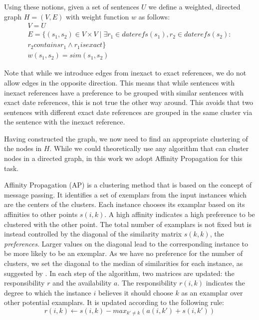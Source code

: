 \documentclass[a4paper,BCOR=10mm]{report}
\numberwithin{lemma}{chapter}
\numberwithin{definition}{chapter}
\begin{document}
Using these notions, given a set of sentences $U$ we define a weighted, directed graph $H = (V, E)$ with weight function $w$ as follows:
\begin{align}
V = U \\
E = \{ (s_1, s_2) \in V \times V \mid \exists r_1 \in \mathit{daterefs}(s_1), r_2 \in \mathit{daterefs}(s_2) \colon \\ r_2 \mathit{ contains } r_1 \land r_1 \mathit{ is exact} \} \\ %
w(s_1, s_2) = \mathit{sim}(s_1, s_2)
\end{align}

Note that while we introduce edges from inexact to exact references, we do not allow edges in the opposite direction. This means that while sentences with inexact references have a preference to be grouped with similar sentences with exact date references, this is not true the other way around.
This avoids that two sentences with different exact date references are grouped in the same cluster via the sentence with the inexact reference.

Having constructed the graph, we now need to find an appropriate clustering of the nodes in $H$. While we could theoretically use any algorithm that can cluster nodes in a directed graph, in this work we adopt Affinity Propagation for this task.

Affinity Propagation (AP) \citep{ap} is a clustering method that is based on the concept of message passing. It identifies a set of exemplars from the input instances which are the centers of the clusters. Each instance chooses its examplar based on its affinities to other points $s(i, k)$. A high affinity indicates a high preference to be clustered with the other point.
The total number of examplars is not fixed but is instead controlled by the diagonal of the similarity matrix $s(k, k)$, the \textit{preferences}. Larger values on the diagonal lead to the corresponding instance to be more likely to be an exemplar.
As we have no preference for the number of clusters, we set the diagonal to the median of similarities for each instance, as suggested by \citeauthor{ap}.
In each step of the algorithm, two matrices are updated: the responsibility $r$ and the availability $a$. The responsibility $r(i, k)$ indicates the degree to which the instance $i$ believes it should choose $k$ as an examplar over other potential examplars. It is updated according to the following rule:
\begin{equation}
r(i, k) \leftarrow s(i, k) - max_{k' \neq k}( a(i, k') + s(i, k') )
\end{equation}
\end{document}
